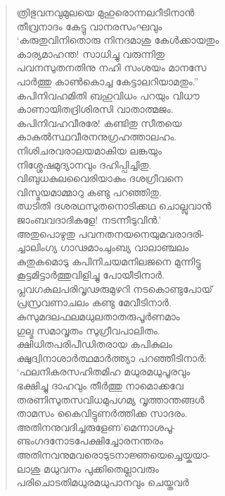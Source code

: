 \begin{verse}
ത്രിഭുവനവുമുലയെ മുഹുരൊന്നലറീടിനാന്‍\\
തീവ്രനാദം കേട്ടു വാനരസംഘവും\\
‘കരുതുവിനിതൊരു നിനദമാശു കേള്‍ക്കായതും\\
കാര്യമാഹന്ത! സാധിച്ചു വരുന്നിതു\\
പവനസുതനതിനു നഹി സംശയം മാനസേ\\
പാര്‍ത്തു കാണ്‍കൊച്ച കേട്ടാലറിയാമതും.”\\
കപിനിവഹമിതി ബഹുവിധം പറയും വിധൗ\\
കാണായിതദ്രിശിരസി വാതാത്മജം.\\
കപിനിവഹവീരരേ! കണ്ടിതു സീതയെ\\
കാകുല്‍സ്ഥവീരനനുഗ്രഹത്താലഹം.\\
നിശിചരവരാലയമാകിയ ലങ്കയും\\
നിശ്ശേഷമുദ്യാനവും ദഹിപ്പിച്ചിതു.\\
വിബുധകുലവൈരിയാകും ദശഗ്രീവനെ\\
വിസ്മയമാമ്മാറു കണ്ടു പറഞ്ഞിതു.\\
ഝടിതി ദശരഥസുതനൊടിക്കഥ ചൊല്ലുവാന്‍\\
ജാംബവദാദികളേ! നടന്നീടുവിന്‍.’\\
അതുപൊഴുതു പവനതനയനെയുമവരാദരി-\\
ച്ചാലിംഗ്യ ഗാഢമാംചുംബ്യ വാലാഞ്ചലം\\
കുതുകമൊടു കപിനിചയമനിലജനെ മുന്നിട്ടു\\
കൂട്ടമിട്ടാര്‍ത്തുവിളിച്ചു പോയീടിനാര്‍.\\
പ്ലവഗകുലപരിവൃഢരുമുഴറി നടകൊണ്ടുപോയ്\\
പ്രസ്രവണാചലം കണ്ടു മേവീടിനാര്‍.\\
കുസുമദലഫലമധുലതാതരുപൂര്‍ണമാം\\
ഗുല്മ സമാവൃതം സുഗ്രീവപാലിതം.\\
ക്ഷിധിതപരിപീഡിതരായ കപികുലം\\
ക്ഷുദ്വിനാശാര്‍ത്ഥമാര്‍ത്ത്യാ പറഞ്ഞീടിനാര്‍:\\
‘ഫലനികരസഹിതമിഹ മധുരമധുപൂരവും\\
ഭക്ഷിച്ചു ദാഹവും തീര്‍ത്തു നാമൊക്കവേ\\
തരണിസുതസവിധമുപഗമ്യ വൃത്താന്തങ്ങള്‍\\
താമസം കൈവിട്ടുണര്‍ത്തിക്ക സാദരം.\\
അതിനനുവദിച്ചരുളേണ’മെന്നാശപൂ-\\
ണ്ടംഗദനോടപേക്ഷിച്ചോരനന്തരം\\
അതിനവനുമവരൊടുടനാജ്ഞയെച്ചെയ്കയാ-\\
ലാശു മധുവനം പുക്കിതെല്ലാവരും\\
പരിചൊടതിമധുരമധുപാനവും ചെയ്തവര്‍\\

\end{verse}
